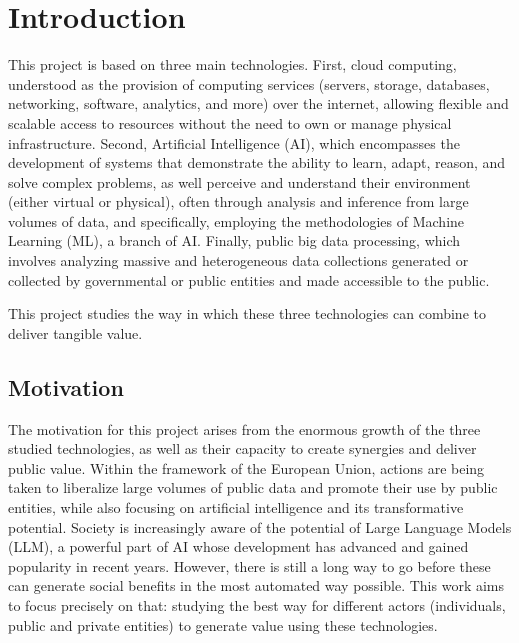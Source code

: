 \chapter{Introduction}
\label{cap:introduction}


\vspace{1cm}

This project is based on three main technologies. First, cloud computing, understood as the provision of computing services (servers, storage, databases, networking, software, analytics, and more) over the internet, allowing flexible and scalable access to resources without the need to own or manage physical infrastructure. Second, Artificial Intelligence (AI), which encompasses the development of systems that demonstrate the ability to learn, adapt, reason, and solve complex problems, as well perceive and understand their environment (either virtual or physical), often through analysis and inference from large volumes of data, and specifically, employing the methodologies of Machine Learning (ML), a branch of AI. Finally, public big data processing, which involves analyzing massive and heterogeneous data collections generated or collected by governmental or public entities and made accessible to the public.

This project studies the way in which these three technologies can combine to deliver tangible value.

\section{Motivation}

The motivation for this project arises from the enormous growth of the three studied technologies, as well as their capacity to create synergies and deliver public value. Within the framework of the European Union, actions are being taken to liberalize large volumes of public data and promote their use by public entities, while also focusing on artificial intelligence and its transformative potential. Society is increasingly aware of the potential of Large Language Models (LLM), a powerful part of AI whose development has advanced and gained popularity in recent years. However, there is still a long way to go before these can generate social benefits in the most automated way possible. This work aims to focus precisely on that: studying the best way for different actors (individuals, public and private entities) to generate value using these technologies.

